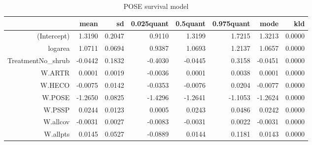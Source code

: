 \begin{table}[ht]
\centering
\begin{tabular}{rrrrrrrr}
  \hline
 & mean & sd & 0.025quant & 0.5quant & 0.975quant & mode & kld \\ 
  \hline
(Intercept) & 1.3190 & 0.2047 & 0.9110 & 1.3199 & 1.7215 & 1.3213 & 0.0000 \\ 
  logarea & 1.0711 & 0.0694 & 0.9387 & 1.0693 & 1.2137 & 1.0657 & 0.0000 \\ 
  TreatmentNo\_shrub & -0.0442 & 0.1832 & -0.4030 & -0.0445 & 0.3158 & -0.0451 & 0.0000 \\ 
  W.ARTR & 0.0001 & 0.0019 & -0.0036 & 0.0001 & 0.0038 & 0.0001 & 0.0000 \\ 
  W.HECO & -0.0075 & 0.0142 & -0.0353 & -0.0076 & 0.0204 & -0.0077 & 0.0000 \\ 
  W.POSE & -1.2650 & 0.0825 & -1.4296 & -1.2641 & -1.1053 & -1.2624 & 0.0000 \\ 
  W.PSSP & 0.0244 & 0.0123 & 0.0005 & 0.0243 & 0.0486 & 0.0242 & 0.0000 \\ 
  W.allcov & -0.0031 & 0.0027 & -0.0083 & -0.0031 & 0.0022 & -0.0031 & 0.0000 \\ 
  W.allpts & 0.0145 & 0.0527 & -0.0889 & 0.0144 & 0.1181 & 0.0143 & 0.0000 \\ 
   \hline
\end{tabular}
\caption{POSE survival model} 
\label{POSEsurvival}
\end{table}


